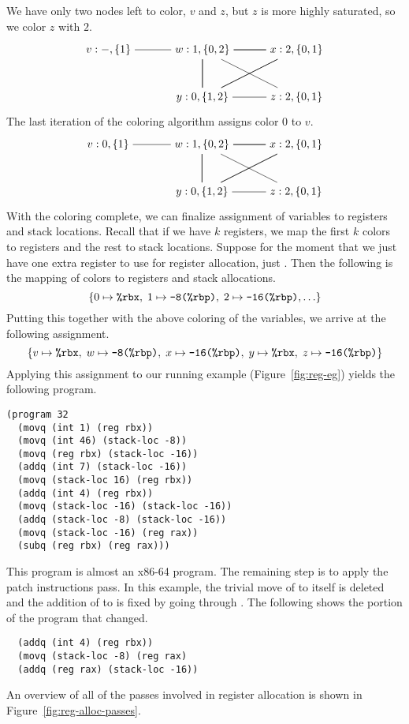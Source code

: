 \documentclass[12pt]{book}
\begin{document}
We have only two nodes left to color, $v$ and $z$, but $z$ is
more highly saturated, so we color $z$ with $2$.
\[
\begin{tikzpicture}[baseline=(current  bounding  box.center)]
\node (v) at (0,0)   {$v:-,\{1\}$};
\node (w) at (3,0)   {$w:1,\{0,2\}$};
\node (x) at (6,0)   {$x:2,\{0,1\}$};
\node (y) at (3,-1.5)  {$y:0,\{1,2\}$};
\node (z) at (6,-1.5)  {$z:2,\{0,1\}$};
\draw (v) to (w);
\foreach \i in {w,x,y} 
{
  \foreach \j in {w,x,y}
  { 
    \draw (\i) to (\j);
  }
}
\draw (z) to (w);
\draw (z) to (y);
\end{tikzpicture}
\]
The last iteration of the coloring algorithm assigns color $0$ to $v$.
\[
\begin{tikzpicture}[baseline=(current  bounding  box.center)]
\node (v) at (0,0)   {$v:0,\{1\}$};
\node (w) at (3,0)   {$w:1,\{0,2\}$};
\node (x) at (6,0)   {$x:2,\{0,1\}$};
\node (y) at (3,-1.5)  {$y:0,\{1,2\}$};
\node (z) at (6,-1.5)  {$z:2,\{0,1\}$};
\draw (v) to (w);
\foreach \i in {w,x,y} 
{
  \foreach \j in {w,x,y}
  { 
    \draw (\i) to (\j);
  }
}
\draw (z) to (w);
\draw (z) to (y);
\end{tikzpicture}
\]
With the coloring complete, we can finalize assignment of variables to
registers and stack locations. Recall that if we have $k$ registers,
we map the first $k$ colors to registers and the rest to stack
locations. Suppose for the moment that we just have one extra register
to use for register allocation, just . Then the following is
the mapping of colors to registers and stack allocations.
\[
  \{ 0 \mapsto \texttt{\%rbx}, \; 1 \mapsto \texttt{-8(\%rbp)}, \; 2 \mapsto \texttt{-16(\%rbp)}, \ldots \}
\]
Putting this together with the above coloring of the variables, we
arrive at the following assignment.
\[
  \{ v \mapsto \texttt{\%rbx}, \;
  w \mapsto \texttt{-8(\%rbp)},  \;
  x \mapsto \texttt{-16(\%rbp)}, \;
  y \mapsto \texttt{\%rbx},  \;
  z\mapsto \texttt{-16(\%rbp)} \}
\]
Applying this assignment to our running example
(Figure~\ref{fig:reg-eg}) yields the following program.
\begin{lstlisting}
(program 32
  (movq (int 1) (reg rbx))
  (movq (int 46) (stack-loc -8))
  (movq (reg rbx) (stack-loc -16))
  (addq (int 7) (stack-loc -16))
  (movq (stack-loc 16) (reg rbx))
  (addq (int 4) (reg rbx))
  (movq (stack-loc -16) (stack-loc -16))
  (addq (stack-loc -8) (stack-loc -16))
  (movq (stack-loc -16) (reg rax))
  (subq (reg rbx) (reg rax)))
\end{lstlisting}
This program is almost an x86-64 program. The remaining step is to apply
the patch instructions pass. In this example, the trivial move of
 to itself is deleted and the addition of
 to  is fixed by going through
. The following shows the portion of the program that
changed.
\begin{lstlisting}
  (addq (int 4) (reg rbx))
  (movq (stack-loc -8) (reg rax)
  (addq (reg rax) (stack-loc -16))
\end{lstlisting}
An overview of all of the passes involved in register allocation is
shown in Figure~\ref{fig:reg-alloc-passes}.
\end{document}
